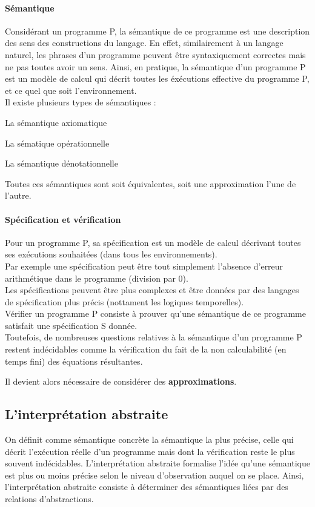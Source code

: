 \documentclass[french]{report}
\begin{document}
\paragraph{Sémantique}
Considérant un programme P, la sémantique de ce programme est une description des sens des
constructions du langage. En effet, similairement à un langage naturel, les phrases d'un programme
peuvent être syntaxiquement correctes mais ne pas toutes avoir un sens. Ainsi, en pratique,
la sémantique d'un programme P est un modèle de calcul qui décrit toutes les
éxécutions effective du programme P, et ce quel que soit l'environnement. \\
Il existe plusieurs types de sémantiques :
\begin{description}
    \item La sémantique axiomatique
    \item La sématique opérationnelle
    \item La sémantique dénotationnelle
\end{description}
Toutes ces sémantiques sont soit équivalentes, soit une approximation l'une de l'autre.

\paragraph{Spécification et vérification}
Pour un programme P, sa spécification est un modèle de calcul décrivant toutes ses
exécutions souhaitées (dans tous les environnements).  \\
Par exemple une spécification peut être tout simplement l'absence d'erreur arithmétique
dans le programme (division par 0). \\
Les spécifications peuvent être plus complexes et être données par des langages
de spécification plus précis (nottament les logiques temporelles). \\
Vérifier un programme P consiste à prouver qu’une sémantique de ce programme
satisfait une spécification S donnée. \\

Toutefois, de nombreuses questions relatives à la sémantique d'un programme P restent indécidables
comme la vérification du fait de la non calculabilité (en temps fini) des équations résultantes.

Il devient alors nécessaire de considérer des \textbf{approximations}.

\subsection{L'interprétation abstraite}
On définit comme sémantique concrète la sémantique la plus précise, celle qui décrit l'exécution
réelle d'un programme mais dont la vérification reste le plus souvent indécidables.
L’interprétation abstraite formalise l’idée qu’une sémantique est plus ou moins précise
selon le niveau d’observation auquel on se place. Ainsi, l'interprétation abstraite consiste à
déterminer des sémantiques liées par des relations d'abstractions.
\end{document}
